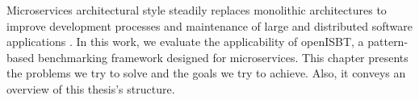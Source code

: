Microservices architectural style steadily replaces monolithic architectures to improve development processes and maintenance of large and distributed software applications \cite{martin_fowler_microservices, otto_microservices}. In this work, we evaluate the applicability of openISBT, a pattern-based benchmarking framework designed for microservices.
This chapter presents the problems we try to solve and the goals we try to achieve. Also, it conveys an overview of this thesis's structure.